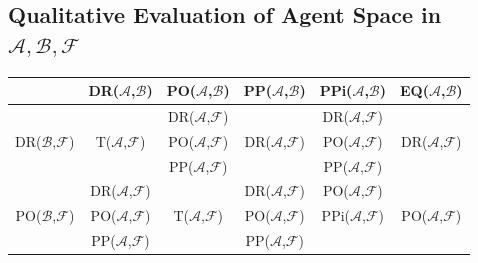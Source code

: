 \documentclass[conference]{IEEEtran}
\newcommand{\assertionRegion}{\mathcal{A}}
\newcommand{\beliefRegion}{\mathcal{B}}
\newcommand{\factRegion}{\mathcal{F}}
\newcommand{\abf}{\assertionRegion,\beliefRegion,\factRegion}
\newcommand{\eq}[2]{EQ(#1,#2)}
\newcommand{\pp}[2]{PP(#1,#2)}
\newcommand{\po}[2]{PO(#1,#2)}
\newcommand{\ppi}[2]{PPi(#1,#2)}
\newcommand{\dr}[2]{DR(#1,#2)}
\newcommand{\all}[2]{T(#1,#2)}
\begin{document}
\subsection{Qualitative Evaluation of Agent Space in $\abf$}\label{sec:agentspace}
\begin{table}[t]
\centering
\begin{adjustbox}{width=.6\textwidth}
\begin{tabular}{r||c|c|c|c|c} 
& \dr{$\assertionRegion$}{$\beliefRegion$} & 
	\po{$\assertionRegion$}{$\beliefRegion$}& 
	\pp{$\assertionRegion$}{$\beliefRegion$} &
	\ppi{$\assertionRegion$}{$\beliefRegion$} & 
	\eq{$\assertionRegion$}{$\beliefRegion$} \\
\hline
\hline %
 \multirow{3}{*}{\dr{$\beliefRegion$}{$\factRegion$}} & 
	\cellcolor{abfred} & %
	\cellcolor{abf-rg-1}\dr{$\assertionRegion$}{$\factRegion$} & %
	\cellcolor{abf-rg-2}\multirow{3}{*}{\dr{$\assertionRegion$}{$\factRegion$}} & %
	\cellcolor{abf-rg-3} \dr{$\assertionRegion$}{$\factRegion$}& %
	 \cellcolor{abf-rg-4} \\ %
& \cellcolor{abfred}\all{$\assertionRegion$}{$\factRegion$}& %
	\cellcolor{abf-rg-1}\po{$\assertionRegion$}{$\factRegion$} & %
	\cellcolor{abf-rg-2}\dr{$\assertionRegion$}{$\factRegion$} & %
	\cellcolor{abf-rg-3}\po{$\assertionRegion$}{$\factRegion$} & %
	\cellcolor{abf-rg-4}\dr{$\assertionRegion$}{$\factRegion$}\\ %
 & \cellcolor{abfred}& %
	\cellcolor{abf-rg-1}\pp{$\assertionRegion$}{$\factRegion$} & %
	\cellcolor{abf-rg-2}  & %
	\cellcolor{abf-rg-3}\pp{$\assertionRegion$}{$\factRegion$} & %
	\cellcolor{abf-rg-4} \\ %
\hline %
 \multirow{3}{*}{\po{$\beliefRegion$}{$\factRegion$}} &
	\cellcolor{abf-rg-1}\dr{$\assertionRegion$}{$\factRegion$} & %
	\cellcolor{abf-rg-2} & %
	\cellcolor{abf-rg-3}\dr{$\assertionRegion$}{$\factRegion$} & %
	\cellcolor{abf-rg-4}\po{$\assertionRegion$}{$\factRegion$} & %
	\cellcolor{abf-rg-5} \\ %
 & \cellcolor{abf-rg-1}\po{$\assertionRegion$}{$\factRegion$} & %
	\cellcolor{abf-rg-2} \all{$\assertionRegion$}{$\factRegion$} & %
	\cellcolor{abf-rg-3}\po{$\assertionRegion$}{$\factRegion$} & %
	\cellcolor{abf-rg-4}\ppi{$\assertionRegion$}{$\factRegion$} & %
	\cellcolor{abf-rg-5} \po{$\assertionRegion$}{$\factRegion$}\\%
 & \cellcolor{abf-rg-1}\pp{$\assertionRegion$}{$\factRegion$} & %
	\cellcolor{abf-rg-2} &  %
	\cellcolor{abf-rg-3}\pp{$\assertionRegion$}{$\factRegion$} & %

\end{tabular}
\end{adjustbox}
\end{table}
\end{document}
